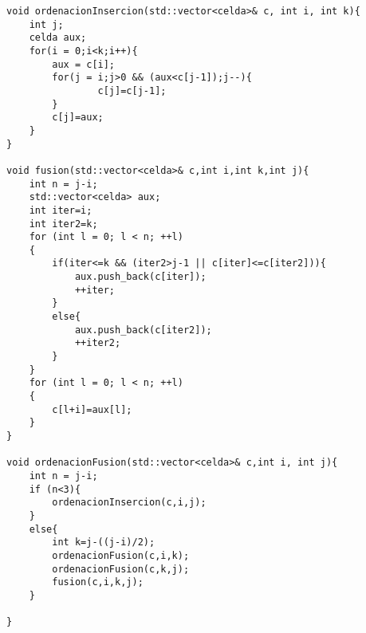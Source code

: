 \begin{lstlisting}
void ordenacionInsercion(std::vector<celda>& c, int i, int k){
    int j;
    celda aux;
    for(i = 0;i<k;i++){
        aux = c[i];
        for(j = i;j>0 && (aux<c[j-1]);j--){
                c[j]=c[j-1];
        }
        c[j]=aux;
    }
}

void fusion(std::vector<celda>& c,int i,int k,int j){
    int n = j-i;
    std::vector<celda> aux;
    int iter=i;
    int iter2=k;
    for (int l = 0; l < n; ++l)
    {
        if(iter<=k && (iter2>j-1 || c[iter]<=c[iter2])){
            aux.push_back(c[iter]);
            ++iter;
        }
        else{
            aux.push_back(c[iter2]);
            ++iter2;
        }       
    }
    for (int l = 0; l < n; ++l)
    {
        c[l+i]=aux[l];
    }
}

void ordenacionFusion(std::vector<celda>& c,int i, int j){
    int n = j-i;
    if (n<3){
        ordenacionInsercion(c,i,j);
    }
    else{
        int k=j-((j-i)/2);
        ordenacionFusion(c,i,k);
        ordenacionFusion(c,k,j);
        fusion(c,i,k,j);    
    }

}
\end{lstlisting}